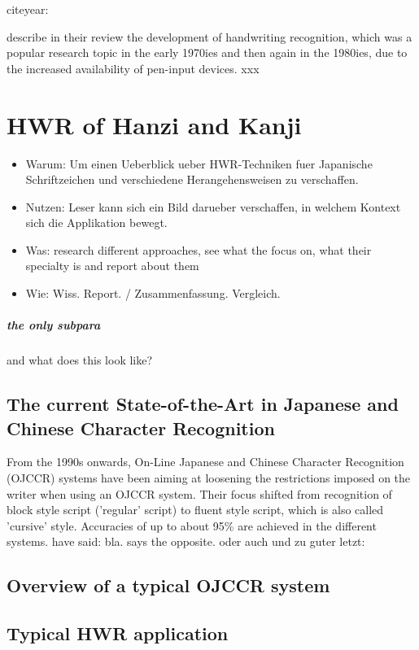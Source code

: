 citeyear: \citeyear{Tappert1990}

describe in their review the development of handwriting recognition, which was a popular research topic in the early 1970ies and then again in the 1980ies, due to the increased availability of pen-input devices.
xxx



\section{HWR of Hanzi and Kanji}
\begin{itemize}
\item Warum: Um einen Ueberblick ueber HWR-Techniken fuer Japanische 
  Schriftzeichen und verschiedene Herangehensweisen zu verschaffen.
\item Nutzen: Leser kann sich ein Bild darueber verschaffen,
  in welchem Kontext sich die Applikation bewegt.
\item Was: research different approaches, see what the focus on, 
  what their specialty is and report about them
\item Wie: Wiss. Report. / Zusammenfassung. Vergleich.
\end{itemize}

\subparagraph{the only subpara}

and what does this look like?

\subsection{The current State-of-the-Art in Japanese and Chinese Character Recognition}
From the 1990s onwards, On-Line Japanese and Chinese Character Recognition 
(OJCCR) systems have been aiming at loosening the restrictions imposed on 
the writer when using an OJCCR system. Their focus shifted from recognition 
of block style script ('regular' script) to fluent style script, 
which is also called 'cursive' style. Accuracies of up to about 95\% are
achieved in the different systems. \cite{LiuJaegerNakagawa2004} have said: 
bla.  says the opposite. \cite{ChenLee1996} oder auch 
\cite{Nakagawa2008} und \cite{Nakai2003} zu guter letzt: \cite{Santosh2009}

\subsection{Overview of a typical OJCCR system}

\subsection{Typical HWR application}

